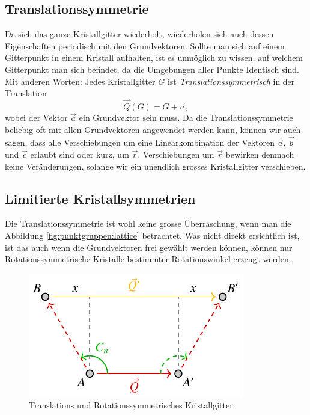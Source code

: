 \subsection{Translationssymmetrie}
Da sich das ganze Kristallgitter wiederholt, wiederholen sich auch dessen Eigenschaften periodisch mit den Grundvektoren.
Sollte man sich auf einem Gitterpunkt in einem Kristall aufhalten, ist es unmöglich zu wissen, auf welchem Gitterpunkt man sich befindet, da die Umgebungen aller Punkte Identisch sind.
Mit anderen Worten: Jedes Kristallgitter \( G \) ist \emph{Translationssymmetrisch} in der Translation 
\[
    \vec{Q}(G) = G + \vec{a},
\]
wobei der Vektor \(\vec{a}\) ein Grundvektor sein muss.
Da die Translationssymmetrie beliebig oft mit allen Grundvektoren angewendet werden kann, können wir auch sagen, dass alle Verschiebungen um eine Linearkombination der Vektoren \(\vec{a}\), \(\vec{b}\) und \(\vec{c}\) erlaubt sind oder kurz, um \(\vec{r}\).
Verschiebungen um \(\vec{r}\) bewirken demnach keine Veränderungen, solange wir ein unendlich grosses Kristallgitter verschieben.

\subsection{Limitierte Kristallsymmetrien}
 Die Translationssymmetrie ist wohl keine grosse Überraschung, wenn man die Abbildung \ref{fig:punktgruppen:lattice} betrachtet.
 Was nicht direkt ersichtlich ist, ist das auch wenn die Grundvektoren frei gewählt werden können, können nur Rotationssymmetrische Kristalle bestimmter Rotationswinkel erzeugt werden.


\begin{figure}
    \centering
    \includegraphics[]{papers/punktgruppen/figures/combine-symmetries}
    \caption{
        Translations und Rotationssymmetrisches Kristallgitter
    }
    \label{fig:punktgruppen:rot-geometry}
\end{figure}

